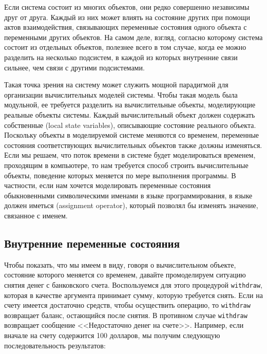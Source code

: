 Если система состоит из многих объектов, они редко совершенно
независимы друг от друга.  Каждый из них может влиять на состояние
других при помощи актов взаимодействия,
связывающих переменные состояния одного объекта с переменными других
объектов.  На самом деле, взгляд, согласно которому система состоит
из отдельных объектов, полезнее всего в том случае, когда ее
можно разделить на несколько подсистем, в каждой из которых внутренние
связи сильнее, чем связи с другими подсистемами.

Такая точка зрения на систему может служить мощной парадигмой для
организации вычислительных моделей системы.  Чтобы такая
модель была модульной, ее требуется разделить на вычислительные
объекты, моделирующие реальные объекты системы.  Каждый вычислительный
объект должен содержать собственные
 (local state variables), описывающие состояние реального объекта.  Поскольку
объекты в моделируемой системе меняются со временем, переменные
состояния соответствующих вычислительных объектов также должны
изменяться.  Если мы решаем, что поток времени в системе будет
моделироваться временем, проходящим в компьютере, то нам требуется
способ строить вычислительные объекты, поведение которых меняется
по мере выполнения программы.  В частности, если нам хочется
моделировать переменные состояния обыкновенными символическими именами
в языке программирования, в языке должен иметься
 (assignment operator),
который позволял бы изменять значение, связанное с именем.

\subsection{Внутренние переменные состояния}
\label{LOCAL-STATE-VARIABLES}


Чтобы показать, что мы имеем в виду, говоря о
вычислительном объекте, состояние которого меняется со временем,
давайте промоделируем ситуацию снятия денег
с  банковского счета.
Воспользуемся для этого процедурой {\tt withdraw}, которая в
качестве аргумента принимает сумму, которую требуется снять.
Если на счету имеется достаточно средств, чтобы осуществить операцию, то
{\tt withdraw} возвращает баланс, остающийся после
снятия.  В противном случае {\tt withdraw} возвращает
сообщение <<Недостаточно денег на счете>>.  Например, если вначале на
счету содержится 100 долларов, мы получим следующую
последовательность результатов:

